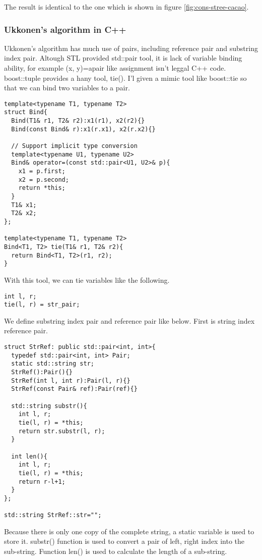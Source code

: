 \documentclass{article}
\begin{document}
The result is identical to the one which is shown in figure \ref{fig:cons-stree-cacao}.

\subsubsection*{Ukkonen's algorithm in C++}
Ukkonen's algorithm has much use of pairs, including reference pair and 
substring index pair. Altough STL provided std::pair tool, it is lack of
variable binding ability, for example (x, y)=apair like assignment isn't
leggal C++ code. boost::tuple provides a hany tool, tie(). I'l given a mimic
tool like boost::tie so that we can bind two variables to a pair.

\lstset{language=C++}
\begin{lstlisting}
template<typename T1, typename T2>
struct Bind{
  Bind(T1& r1, T2& r2):x1(r1), x2(r2){}
  Bind(const Bind& r):x1(r.x1), x2(r.x2){}

  // Support implicit type conversion
  template<typename U1, typename U2>
  Bind& operator=(const std::pair<U1, U2>& p){
    x1 = p.first;
    x2 = p.second;
    return *this;
  }
  T1& x1;
  T2& x2;
};

template<typename T1, typename T2>
Bind<T1, T2> tie(T1& r1, T2& r2){ 
  return Bind<T1, T2>(r1, r2); 
}
\end{lstlisting}

With this tool, we can tie variables like the following.

\begin{lstlisting}
int l, r;
tie(l, r) = str_pair;
\end{lstlisting}

We define substring index pair and reference pair like below.
First is string index reference pair.

\begin{lstlisting}
struct StrRef: public std::pair<int, int>{
  typedef std::pair<int, int> Pair;
  static std::string str;
  StrRef():Pair(){}
  StrRef(int l, int r):Pair(l, r){}
  StrRef(const Pair& ref):Pair(ref){}

  std::string substr(){
    int l, r;
    tie(l, r) = *this;
    return str.substr(l, r);
  }

  int len(){ 
    int l, r;
    tie(l, r) = *this;
    return r-l+1; 
  }
};

std::string StrRef::str="";
\end{lstlisting}

Because there is only one copy of the complete string, a static variable
is used to store it. substr() function is used to convert a pair of left,
right index into the sub-string. Function len() is used to calculate the
length of a sub-string.
\end{document}
